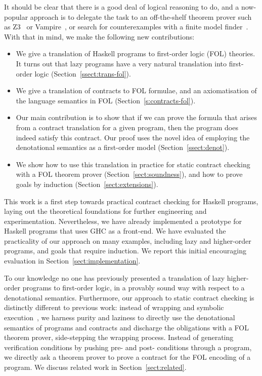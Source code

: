 It should be clear that there is a good deal of logical reasoning to do,
and a now-popular approach is to delegate the task to an off-the-shelf theorem
prover such as Z3~\cite{z3citation} or Vampire~\cite{vampire}, or search for 
counterexamples with a finite model finder~\cite{paradox}.
With that in mind, we make the following new contributions:

\begin{itemize}
  \item We give a translation of Haskell programs to first-order logic (FOL) theories. 
        It turns out that lazy programs have a very natural translation into first-order logic
        (Section~\ref{ssect:trans-fol}).
  \item We give a translation of contracts to FOL formulae, and an axiomatisation of 
        the language semantics in FOL 
        (Section~\ref{s:contracts-fol}).
  \item Our main contribution is to show that if we can prove the formula 
        that arises from a contract translation 
        for a given program, then the program does indeed satisfy this contract. Our proof
        uses the novel idea of employing the denotational 
        semantics as a first-order model (Section~\ref{ssect:denot}).
  \item We show how to use this translation in practice for static contract checking with
        a FOL theorem prover (Section~\ref{sect:soundness}), 
        and how to prove goals by induction (Section~\ref{sect:extensions}).
\end{itemize}

This work is a first step towards practical contract checking 
for Haskell programs, laying out the theoretical foundations for further engineering 
and experimentation. Nevertheless, we have already implemented a prototype for Haskell 
programs that uses GHC as a front-end. We have evaluated the practicality of our approach 
on many examples, including lazy and higher-order programs, and goals that require 
induction. We report this initial encouraging evaluation in 
Section~\ref{sect:implementation}. 

To our knowledge no one has previously presented a translation of lazy higher-order programs to 
first-order logic, in a provably sound way with respect to a denotational
semantics. Furthermore, our approach to static contract checking is 
distinctly different to previous work: instead of wrapping and 
symbolic execution~\cite{xu+:contracts,Xu:2012:HCC:2103746.2103767}, 
we harness purity and laziness to directly use the denotational semantics
of programs and contracts and discharge the obligations with a 
FOL theorem prover, side-stepping
the wrapping process. Instead of generating verification conditions by pushing
pre- and post- conditions through a program, we directly ask a theorem prover to prove 
a contract for the FOL encoding of a program. 
We discuss related work in Section~\ref{sect:related}.

